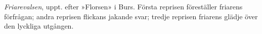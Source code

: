 \textit{Friarevalsen}, uppt. efter »Florsen» i Burs.
Första reprisen föreställer friarens förfrågan; andra reprisen
flickans jakande svar; tredje reprisen friarens glädje över den
lyckliga utgången.
